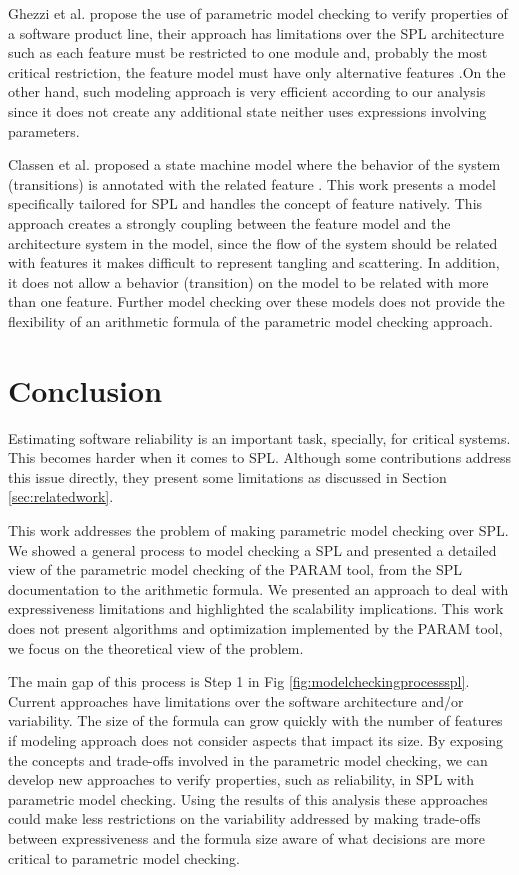 \documentclass[conference]{IEEEtran}
\begin{document}
	Ghezzi et al.
	propose the use of parametric model checking to verify properties of a software product
	line, their approach has limitations over the SPL architecture such as each feature must be
	restricted to one module and, probably the most critical restriction, the feature model
	must have only alternative features \cite{GhezziSPLC,UMARMO}.On the other hand, such modeling approach
	is very efficient according to our analysis since it does not create any additional state neither uses
	expressions involving parameters.
	
	Classen et al. proposed a state machine model where the behavior of the system (transitions)
	is annotated with the related feature \cite{Classen,classenlots}. This work presents
	a model specifically tailored for SPL and handles the concept of feature natively.	
	This approach creates a 
	strongly coupling between the feature model and the architecture system in the model, since the flow 
	of the system should be related with features it makes difficult to represent tangling and scattering.
	In addition, it does not allow a behavior (transition) on the model to be related with more than one feature.
	Further model checking over these models does not provide the flexibility of an arithmetic formula
	of the parametric model checking approach.
	
			
	
\section{Conclusion}
\label{sec:conclusion}

		Estimating software reliability is an important task, specially, for critical systems.
	This becomes harder when it comes to SPL. Although some contributions
	address this issue directly, they present some limitations as discussed in Section \ref{sec:relatedwork}.
	
	This work addresses the problem of making parametric model checking over SPL. We showed a general
	process to model checking a SPL and presented a detailed view of the parametric model 
	checking of the PARAM tool, from the SPL documentation to the arithmetic formula.
	We presented an approach to deal with expressiveness limitations
	and highlighted the scalability implications.	
	This work does not present algorithms and optimization implemented by the PARAM tool, we focus on the theoretical view of the problem.
		
	The main gap of this process is Step 1 in Fig \ref{fig:modelcheckingprocessspl}. 
	Current approaches have limitations over the software architecture and/or variability.
	The size of the formula can grow quickly with the number of features if modeling approach does not 
	consider aspects that impact its size.	
	By exposing the concepts and trade-offs involved in the
	parametric model checking, we can develop new approaches to verify  properties, such as 
	reliability, in SPL with parametric model checking. Using the results of this
	analysis these approaches could make less restrictions on the variability addressed by making trade-offs between
	expressiveness and the formula size aware of what decisions are more critical to
	parametric model checking.
	
\end{document}
